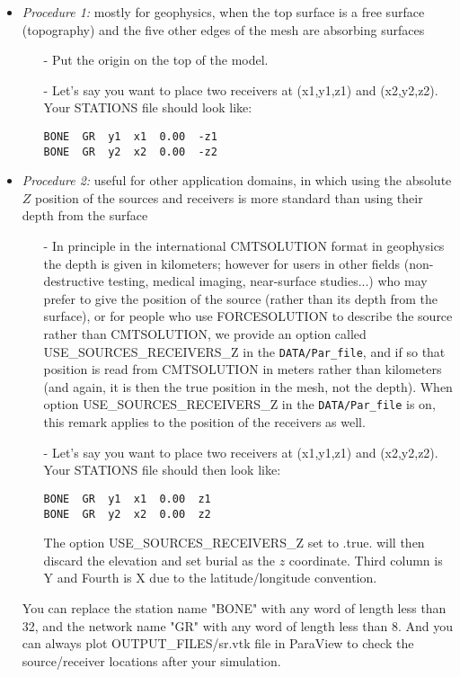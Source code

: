 \begin{itemize}
\item {\it Procedure 1:} mostly for geophysics, when the top surface is a free surface (topography) and the five other edges of the mesh are absorbing surfaces
\begin{enumerate}
\item [-] Put the origin on the top of the model.\\
\item [-] Let's say you want to place two receivers at (x1,y1,z1) and
(x2,y2,z2). Your STATIONS file should look like:
{\small \begin{verbatim}
BONE  GR  y1  x1  0.00  -z1
BONE  GR  y2  x2  0.00  -z2
\end{verbatim}}
\end{enumerate}

\item {\it Procedure 2:} useful for other application domains, in which using the absolute $Z$ position of the sources and receivers is more standard than using their depth from the surface
\begin{enumerate}
\item [-] In principle in the international CMTSOLUTION format in geophysics
the depth is given in kilometers; however for users in other fields (non-destructive testing, medical imaging, near-surface studies...) who may prefer to give the position of the source (rather than its depth from the surface), or for people who use FORCESOLUTION to describe the source rather than CMTSOLUTION, we provide an option called USE\_SOURCES\_RECEIVERS\_Z in the \texttt{DATA/Par\_file}, and if so that position is read from CMTSOLUTION in meters rather than kilometers (and again, it is then the true position in the mesh, not the depth). When option USE\_SOURCES\_RECEIVERS\_Z in the \texttt{DATA/Par\_file} is on, this remark applies to the position of the receivers as well.\\
\item [-] Let's say you want to place two receivers at (x1,y1,z1) and
(x2,y2,z2). Your STATIONS file should then look like:
{\small \begin{verbatim}
BONE  GR  y1  x1  0.00  z1
BONE  GR  y2  x2  0.00  z2
\end{verbatim}}
The option USE\_SOURCES\_RECEIVERS\_Z set to .true. will then discard the elevation and set
burial as the $z$ coordinate.
Third column is Y and Fourth is X due to the latitude/longitude convention.\\
\end{enumerate}

You can replace the station name "BONE" with any word of length less
than 32, and the network name "GR" with any word of length less than
8.
And you can always plot OUTPUT\_FILES/sr.vtk file in ParaView to check the
source/receiver locations after your simulation.\\
\end{itemize}


